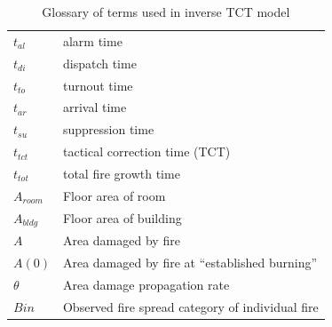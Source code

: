 \documentclass[12pt,oneside]{book}
\begin{document}
\begin{table}[htb]
  \centering
  \caption{Glossary of terms used in inverse TCT model}
  \begin{tabular}{lp{4cm}}
    $t_{al}$ & alarm time \\
    $t_{di}$ & dispatch time \\
    $t_{to}$ & turnout time \\
    $t_{ar}$ & arrival time \\
    $t_{su}$ & suppression time \\
    $t_{tct}$ & tactical correction time (TCT)\\
    $t_{tot}$ & total fire growth time\\
    $A_{room}$ & Floor area of room \\
    $A_{bldg}$ & Floor area of building \\
    $A$ & Area damaged by fire \\
    $A(0)$ & Area damaged by fire at ``established burning'' \\
    $\theta$ & Area damage propagation rate \\
    $Bin$ & Observed fire spread category of individual fire \\
  \end{tabular}
  \label{tab:terminology}
\end{table}
\end{document}
